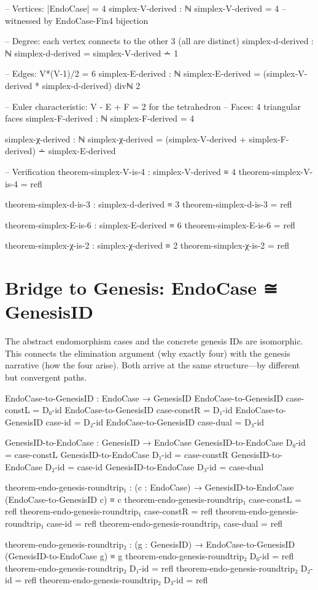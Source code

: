 \documentclass[11pt,a4paper]{book}
\begin{document}
\begin{code}
-- Vertices: |EndoCase| = 4
simplex-V-derived : ℕ
simplex-V-derived = 4  -- witnessed by EndoCase-Fin4 bijection

-- Degree: each vertex connects to the other 3 (all are distinct)
simplex-d-derived : ℕ
simplex-d-derived = simplex-V-derived ∸ 1

-- Edges: V*(V-1)/2 = 6
simplex-E-derived : ℕ
simplex-E-derived = (simplex-V-derived * simplex-d-derived) divℕ 2

-- Euler characteristic: V - E + F = 2 for the tetrahedron
-- Faces: 4 triangular faces
simplex-F-derived : ℕ
simplex-F-derived = 4

simplex-χ-derived : ℕ
simplex-χ-derived = (simplex-V-derived + simplex-F-derived) ∸ simplex-E-derived

-- Verification
theorem-simplex-V-is-4 : simplex-V-derived ≡ 4
theorem-simplex-V-is-4 = refl

theorem-simplex-d-is-3 : simplex-d-derived ≡ 3
theorem-simplex-d-is-3 = refl

theorem-simplex-E-is-6 : simplex-E-derived ≡ 6
theorem-simplex-E-is-6 = refl

theorem-simplex-χ-is-2 : simplex-χ-derived ≡ 2
theorem-simplex-χ-is-2 = refl
\end{code}

\section{Bridge to Genesis: EndoCase ≅ GenesisID}
\label{sec:endo-genesis-bridge}

The abstract endomorphism cases and the concrete genesis IDs are isomorphic.
This connects the elimination argument (why exactly four) with the genesis
narrative (how the four arise). Both arrive at the same structure—by
different but convergent paths.

\begin{code}
EndoCase-to-GenesisID : EndoCase → GenesisID
EndoCase-to-GenesisID case-constL = D₀-id
EndoCase-to-GenesisID case-constR = D₁-id
EndoCase-to-GenesisID case-id     = D₂-id
EndoCase-to-GenesisID case-dual   = D₃-id

GenesisID-to-EndoCase : GenesisID → EndoCase
GenesisID-to-EndoCase D₀-id = case-constL
GenesisID-to-EndoCase D₁-id = case-constR
GenesisID-to-EndoCase D₂-id = case-id
GenesisID-to-EndoCase D₃-id = case-dual

theorem-endo-genesis-roundtrip₁ : (c : EndoCase) →
  GenesisID-to-EndoCase (EndoCase-to-GenesisID c) ≡ c
theorem-endo-genesis-roundtrip₁ case-constL = refl
theorem-endo-genesis-roundtrip₁ case-constR = refl
theorem-endo-genesis-roundtrip₁ case-id     = refl
theorem-endo-genesis-roundtrip₁ case-dual   = refl

theorem-endo-genesis-roundtrip₂ : (g : GenesisID) →
  EndoCase-to-GenesisID (GenesisID-to-EndoCase g) ≡ g
theorem-endo-genesis-roundtrip₂ D₀-id = refl
theorem-endo-genesis-roundtrip₂ D₁-id = refl
theorem-endo-genesis-roundtrip₂ D₂-id = refl
theorem-endo-genesis-roundtrip₂ D₃-id = refl
\end{code}
\end{document}
